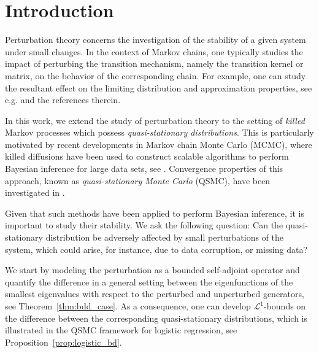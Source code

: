 \documentclass{aptpub}
\begin{document}
\section{Introduction}


Perturbation theory concerns the investigation of
the stability of a given system under small changes. In the context of Markov chains, one typically studies the impact of perturbing the transition mechanism, namely the transition kernel or matrix, on the behavior of the corresponding chain. For example, one can study the resultant effect on the limiting distribution and approximation properties, see e.g.
\cite{kartashov2019strong,roberts1998convergence,mitrophanov2003stability,mitrophanov_2005,rudolf2018} and the references therein.

In this work, we extend the study of perturbation theory to the setting of \textit{killed} Markov processes which possess \textit{quasi-stationary distributions}. This is particularly motivated by recent developments in Markov chain Monte Carlo (MCMC), where killed diffusions have been used to construct scalable algorithms to perform Bayesian inference for large data sets, see \cite{Pollock2020, Kumar2019}. Convergence properties of this approach, known as \textit{quasi-stationary Monte Carlo} (QSMC), have been investigated in \cite{Wang2019TheoQSMC}.


Given that such methods have been applied to perform Bayesian inference, it is important to study their stability. We ask the following question:
Can the quasi-stationary distribution be adversely affected by small perturbations of the system, which could arise, for instance, due to data corruption, or missing data?

We start by modeling the perturbation as a bounded self-adjoint operator and quantify the difference in a general setting between the eigenfunctions of the smallest eigenvalues with respect to the perturbed and unperturbed generators, see Theorem~\ref{thm:bdd_case}.
As a consequence, one can develop $\mathcal{L}^1$-bounds on the difference between the corresponding quasi-stationary distributions, which is illustrated in the QSMC framework for logistic regression, see Proposition~\ref{prop:logistic_bd}.





\end{document}
